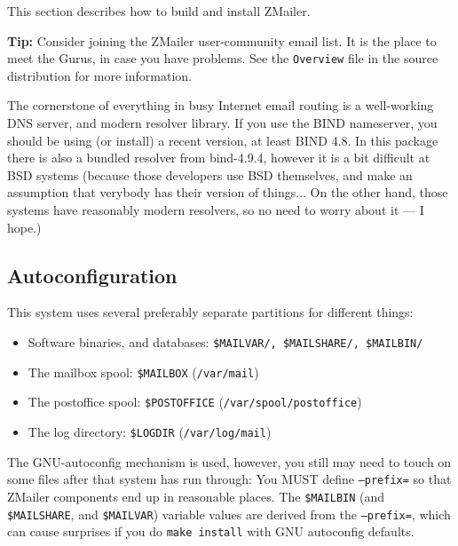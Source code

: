 
This section describes how to build and install ZMailer.

{\bf Tip:} Consider joining the ZMailer user-community email list.
It is the place to meet the Gurus, in case you have problems.
See the {\tt Overview} file in the source distribution for more
information.

The cornerstone of everything in busy Internet email routing
is a well-working DNS server, and modern resolver library.
If you use the BIND nameserver, you should be using (or install)
a recent version, at least BIND 4.8. In this package there is also 
a bundled resolver from  bind-4.9.4, however it is a bit difficult
at BSD systems (because those developers use BSD themselves, and
make an assumption that verybody has their version of things...
On the other hand, those systems have reasonably modern resolvers,
so no need to worry about it --- I hope.) 


\subsection{Autoconfiguration}%
%

This system uses several preferably separate partitions for
different things:%
%

\begin{itemize}
\item Software binaries, and databases: {\tt \$MAILVAR/, \$MAILSHARE/, \$MAILBIN/}
\item The mailbox spool: {\tt \$MAILBOX} ({\tt /var/mail})
\item The postoffice spool: {\tt \$POSTOFFICE} ({\tt /var/spool/postoffice})
\item The log directory: {\tt \$LOGDIR} ({\tt /var/log/mail})
\end{itemize}

The GNU-autoconfig mechanism is used, however, you still may need to
touch on some files after that system has run through:
You MUST define {\tt --prefix=} so that ZMailer components end up
in reasonable places.  The {\tt \$MAILBIN} (and {\tt \$MAILSHARE},
and {\tt \$MAILVAR}) variable values are derived from
the {\tt --prefix=}, which can cause surprises if you do
{\tt make install} with GNU autoconfig defaults.

